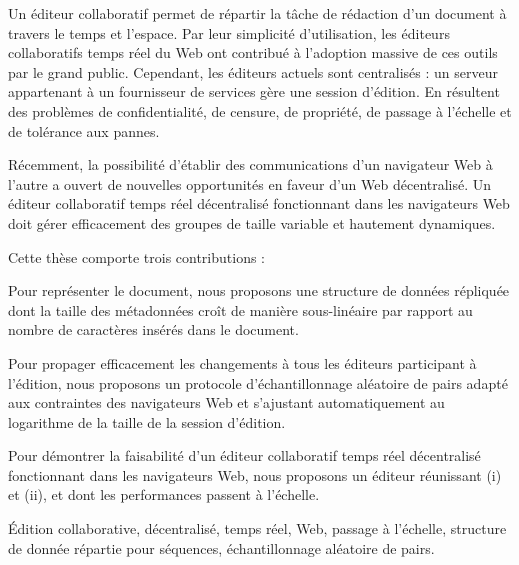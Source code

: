 
\begin{resume}
  Un éditeur collaboratif permet de répartir la tâche de rédaction d'un document
  à travers le temps et l'espace. Par leur simplicité d'utilisation, les
  éditeurs collaboratifs temps réel du Web ont contribué à l'adoption massive de
  ces outils par le grand public. Cependant, les éditeurs actuels sont
  centralisés : un serveur appartenant à un fournisseur de services gère une
  session d'édition. En résultent des problèmes de confidentialité, de censure,
  de propriété, de passage à l'échelle et de tolérance aux pannes.

  \noindent Récemment, la possibilité d'établir des communications d'un
  navigateur Web à l'autre a ouvert de nouvelles opportunités en faveur d'un Web
  décentralisé. Un éditeur collaboratif temps réel décentralisé fonctionnant
  dans les navigateurs Web doit gérer efficacement des groupes de taille
  variable et hautement dynamiques.

  \noindent Cette thèse comporte trois contributions :
  \begin{inparaenum}[(i)]
  \item Pour représenter le document, nous proposons une structure de données
    répliquée dont la taille des métadonnées croît de manière sous-linéaire par
    rapport au nombre de caractères insérés dans le document.
  \item Pour propager efficacement les changements à tous les éditeurs
    participant à l'édition, nous proposons un protocole d'échantillonnage
    aléatoire de pairs adapté aux contraintes des navigateurs Web et s'ajustant
    automatiquement au logarithme de la taille de la session d'édition.
  \item Pour démontrer la faisabilité d'un éditeur collaboratif temps réel
    décentralisé fonctionnant dans les navigateurs Web, nous proposons un
    éditeur réunissant (i) et (ii), et dont les performances passent à
    l'échelle.
  \end{inparaenum}
\end{resume}

\begin{motscles}
  Édition collaborative, décentralisé, temps réel, Web, passage à l'échelle,
  structure de donnée répartie pour séquences, échantillonnage aléatoire de
  pairs.
\end{motscles}

